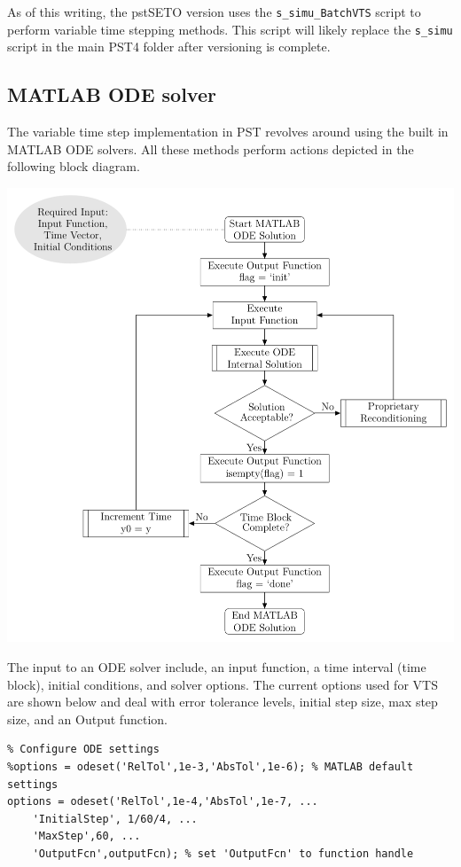 As of this writing, the pstSETO version uses the \verb|s_simu_BatchVTS| script to perform variable time stepping methods.
This script will likely replace the \verb|s_simu| script in the main PST4 folder after versioning is complete.\\

\subsection{MATLAB ODE solver}
The variable time step implementation in PST revolves around using the built in MATLAB ODE solvers.
All these methods perform actions depicted in the following block diagram.

\begin{center}
\includegraphics[width=.8\linewidth]{./../../one-offs/200804-ODEblockDiagram/200804-ODEblockDiagram}
\end{center}

The input to an ODE solver include, an input function, a time interval (time block), initial conditions, and solver options.
The current options used for VTS are shown below and deal with error tolerance levels, initial step size, max step size, and an Output function.

\begin{verbatim}
% Configure ODE settings
%options = odeset('RelTol',1e-3,'AbsTol',1e-6); % MATLAB default settings
options = odeset('RelTol',1e-4,'AbsTol',1e-7, ...
    'InitialStep', 1/60/4, ...
    'MaxStep',60, ...
    'OutputFcn',outputFcn); % set 'OutputFcn' to function handle
\end{verbatim}


